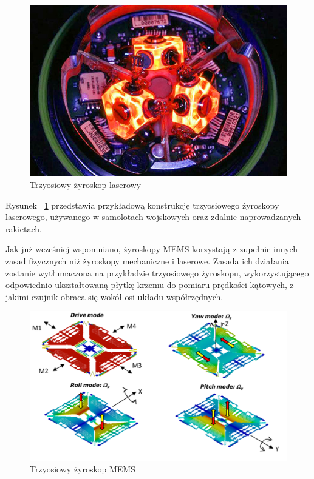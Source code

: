 \begin{figure}[H]
	\centering
	\includegraphics[scale=0.4]{Pictures/3d_laser_ring_gyro.jpg}
        \caption[Trzyosiowy żyroskop laserowy]{Trzyosiowy żyroskop laserowy}
        \label{fig:3d_laser_ring_gyro}
\end{figure}

Rysunek ~\ref{fig:3d_laser_ring_gyro} przedstawia przykładową konstrukcję trzyosiowego żyroskopy laserowego, używanego w samolotach wojskowych oraz zdalnie naprowadzanych rakietach. 

Jak już wcześniej wspomniano, żyroskopy MEMS korzystają z zupełnie innych zasad fizycznych niż żyroskopy mechaniczne i laserowe. Zasada ich działania zostanie wytłumaczona na przykładzie trzyosiowego żyroskopu, wykorzystującego odpowiednio ukształtowaną płytkę krzemu do pomiaru prędkości kątowych, z jakimi czujnik obraca się wokół osi układu współrzędnych.

\begin{figure}[H]
	\centering
	\includegraphics[scale=0.4]{Pictures/3d_gyro.png}
        \caption[Trzyosiowy żyroskop MEMS]{Trzyosiowy żyroskop MEMS}
        \label{fig:3d_gyro}
\end{figure}

